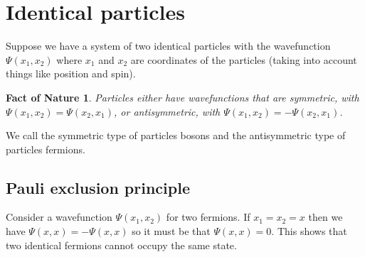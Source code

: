 \documentclass[11pt]{article}
\theoremstyle{theorem}
\newtheorem{fact}{Fact of Nature}
\theoremstyle{remark}
\theoremstyle{step}
\theoremstyle{gap}
\begin{document}
\section{Identical particles}

Suppose we have a system of two identical particles with the wavefunction \(\Psi(x_1, x_2)\) where \(x_1\) and \(x_2\) are coordinates of the particles (taking into account things like position and spin).

\begin{fact}
Particles either have wavefunctions that are symmetric, with \(\Psi(x_1, x_2) = \Psi(x_2, x_1)\), or antisymmetric, with \(\Psi(x_1, x_2) = -\Psi(x_2, x_1)\).
\end{fact}

We call the symmetric type of particles bosons and the antisymmetric type of particles fermions.

\subsection{Pauli exclusion principle}

Consider a wavefunction \(\Psi(x_1, x_2)\) for two fermions. If \(x_1 = x_2 = x\) then we have \(\Psi(x, x) = - \Psi(x, x)\) so it must be that \(\Psi(x, x) = 0\). This shows that two identical fermions cannot occupy the same state.
\end{document}
